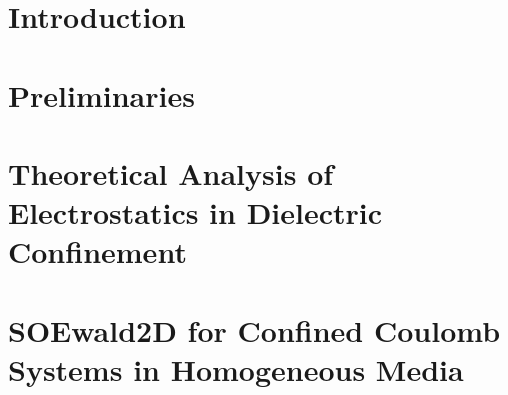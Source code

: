\documentclass[a4paper]{ustthesis}
\begin{document}



\chapter{Introduction}
\label{chp_intro}

\newpage

\chapter{Preliminaries}
\label{chp_preliminaries}

\newpage

\chapter{Theoretical Analysis of Electrostatics in Dielectric Confinement}
\label{chp_icmewald2d}

\newpage

\chapter{SOEwald2D for Confined Coulomb Systems in Homogeneous Media}
\label{chp_soewald2d}

\newpage
\end{document}
